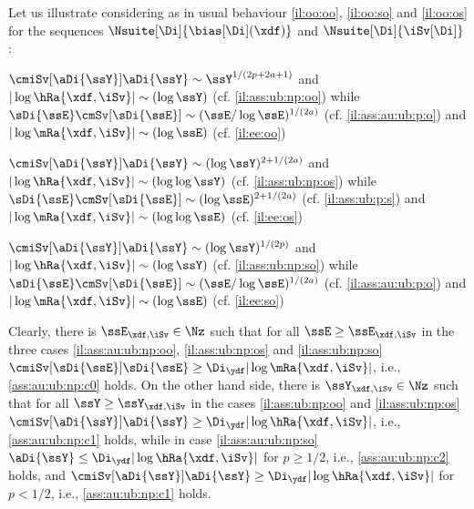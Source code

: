 \begin{il}\label{il:ass:au:ub:np}
Let us illustrate  
  considering as in  usual
  behaviour \ref{il:oo:oo}, \ref{il:oo:so} and \ref{il:oo:os}
 for the sequences $\Nsuite[\Di]{\bias[\Di](\xdf)}$ and
  $\Nsuite[\Di]{\iSv[\Di]}$:
 \begin{Liste}[]
\item[\mylabel{il:ass:au:ub:np:oo}{\dg\bfseries{[o-o]}}]
$\cmiSv[\aDi{\ssY}]\aDi{\ssY}\sim\ssY^{1/(2p+2a+1)}$ and
$|\log\hRa{\xdf,\iSv}|\sim(\log\ssY)$ (cf.  
\ref{il:ass:ub:np:oo}) while
$\sDi{\ssE}\cmSv[\sDi{\ssE}]\sim (\ssE/\log\ssE)^{1/(2a)}$ (cf.  
\ref{il:ass:au:ub:p:o})  and $|\log\mRa{\xdf,\iSv}|\sim(\log\ssE)$ (cf.  
\ref{il:ee:oo})
 \item[\mylabel{il:ass:au:ub:np:os}{\dg\bfseries{[o-s]}}]
$\cmiSv[\aDi{\ssY}]\aDi{\ssY}\sim(\log \ssY)^{2+1/(2a)}$ and
$|\log\hRa{\xdf,\iSv}|\sim(\log\log\ssY)$ (cf.  
\ref{il:ass:ub:np:os}) while
$\sDi{\ssE}\cmSv[\sDi{\ssE}]\sim (\log\ssE)^{2+1/(2a)}$ (cf.  
\ref{il:ass:ub:p:s})  and $|\log\mRa{\xdf,\iSv}|\sim(\log\log\ssE)$ (cf.  
\ref{il:ee:os})
 \item[\mylabel{il:ass:au:ub:np:so}{\dg\bfseries{[s-o]}}]
$\cmiSv[\aDi{\ssY}]\aDi{\ssY}\sim(\log \ssY)^{1/(2p)}$ and
$|\log\hRa{\xdf,\iSv}|\sim(\log\ssY)$ (cf.  
\ref{il:ass:ub:np:so}) while
$\sDi{\ssE}\cmSv[\sDi{\ssE}]\sim (\ssE/\log\ssE)^{1/(2a)}$ (cf.  
\ref{il:ass:au:ub:p:o}) and $|\log\mRa{\xdf,\iSv}|\sim(\log\ssE)$ (cf.  
\ref{il:ee:so})
\end{Liste}
Clearly, there is ${\ssE}_{\xdf,\iSv}\in\Nz$ such that for all
$\ssE\geq{\ssE}_{\xdf,\iSv}$ in the three cases
\ref{il:ass:au:ub:np:oo}, \ref{il:ass:ub:np:os} and
\ref{il:ass:ub:np:so}   $\cmiSv[\sDi{\ssE}]\sDi{\ssE}\geq
\Di_{\ydf}|\log\mRa{\xdf,\iSv}|$, i.e., 
\ref{ass:au:ub:np:c0} holds.
On the other hand side,  there is ${\ssY}_{\xdf,\iSv}\in\Nz$ such that for all
$\ssY\geq{\ssY}_{\xdf,\iSv}$ in the cases \ref{il:ass:ub:np:oo} and
\ref{il:ass:ub:np:os}   $\cmiSv[\aDi{\ssY}]\aDi{\ssY}\geq
\Di_{\ydf}|\log\hRa{\xdf,\iSv}|$, i.e., 
\ref{ass:au:ub:np:c1} holds,   while in case \ref{il:ass:au:ub:np:so}
$\aDi{\ssY}\leq \Di_{\ydf}|\log\hRa{\xdf,\iSv}|$ for $p\geq1/2$, i.e., 
\ref{ass:au:ub:np:c2} holds, and $\cmiSv[\aDi{\ssY}]\aDi{\ssY}\geq
\Di_{\ydf}|\log\hRa{\xdf,\iSv}|$ for $p<1/2$, i.e., 
\ref{ass:au:ub:np:c1} holds.
\end{il}

